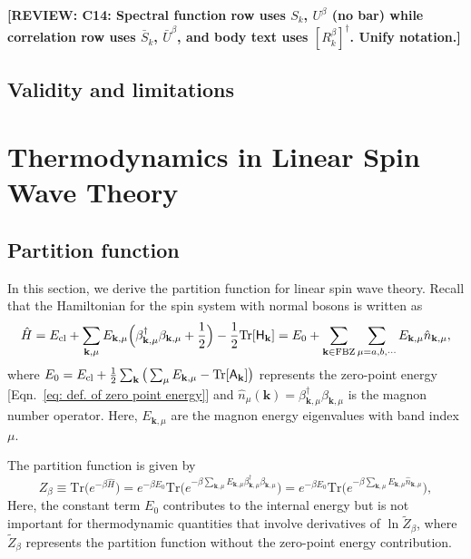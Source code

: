\documentclass[aps, prx, nofootinbib, superscriptaddress]{revtex4-2}
\newcommand{\REVIEW}[1]{{\color{reviewcolor}\bfseries [REVIEW: #1]}}
\newcommand{\kvec}{\mathbf{k}}
\newcommand{\Tr}{\mathrm{Tr}}
\begin{document}
\REVIEW{C14: Spectral function row uses $S_k$, $U^\beta$ (no bar) while correlation row uses $\bar{S}_k$, $\bar{U}^\beta$, and body text uses $[R^\beta_k]^\dagger$. Unify notation.}









\newpage

\subsection{Validity and limitations}


\section{Thermodynamics in Linear Spin Wave Theory}
\subsection{Partition function}\label{subsec: Partition Function}
In this section, we derive the partition function for linear spin wave theory. 
Recall that the Hamiltonian for the spin system with normal bosons is written as 
\begin{align}
    \hat{H} = E_{\rm cl} + \sum_{\kvec, \mu} E_{\kvec, \mu} \Big( \beta^{\dagger}_{\kvec, \mu} \beta_{\kvec, \mu} + \frac{1}{2} \Big) - \frac{1}{2} \Tr [\mathsf{H}_{\kvec}] 
    = E_{0} + \sum_{\kvec \in \mathrm{FBZ}} \sum_{\mu = a, b, \cdots} E_{\kvec, \mu} \hat{n}_{\kvec, \mu},
\end{align}
where $E_{0} = E_{\rm cl} + \frac{1}{2} \sum_{\kvec} \big( \sum_{\mu} E_{\kvec, \mu} - \Tr [\mathsf{A}_{\kvec}] \big)$ represents the zero-point energy [Eqn.~\eqref{eq: def. of zero point energy}] and $\hat{n}_{\mu}(\kvec) = \beta^{\dagger}_{\kvec, \mu} \beta_{\kvec, \mu}$ is the magnon number operator. Here, $E_{\kvec, \mu}$ are the magnon energy eigenvalues with band index $\mu$.

The partition function is given by
\begin{equation}
    Z_{\beta} \equiv \Tr \big( e^{- \beta \hat{H}} \big) 
    = e^{- \beta E_{0}}  \Tr \big( e^{- \beta \sum_{\kvec, \mu} E_{\kvec, \mu} \beta^{\dagger}_{\kvec, \mu} \beta_{\kvec, \mu}} \big) 
    = e^{- \beta E_{0}} \Tr \big( e^{- \beta \sum_{\kvec, \mu} E_{\kvec, \mu} \hat{n}_{\kvec, \mu}} \big),
\end{equation}
Here, the constant term $E_0$ contributes to the internal energy but is not important for thermodynamic quantities that involve derivatives of $\ln \tilde{Z}_{\beta}$, where $\tilde{Z}_{\beta}$ represents the partition function without the zero-point energy contribution.
\end{document}

